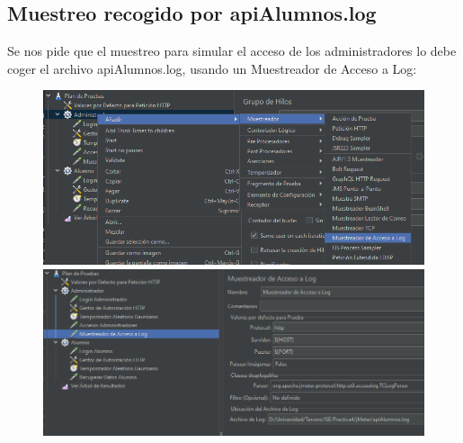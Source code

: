 \documentclass[a4paper]{article}
\begin{document}
\subsection{Muestreo recogido por apiAlumnos.log}
Se nos pide que el muestreo para simular el acceso de los administradores lo
debe coger el archivo apiAlumnos.log, usando un Muestreador de Acceso a Log:
\newpage
\begin{figure}
    \centering
    \includegraphics[width=\textwidth]{muestreador de acceso a log1.png}
    \includegraphics[width=\textwidth]{muestrador configurado1.png}
\end{figure}
\end{document}
